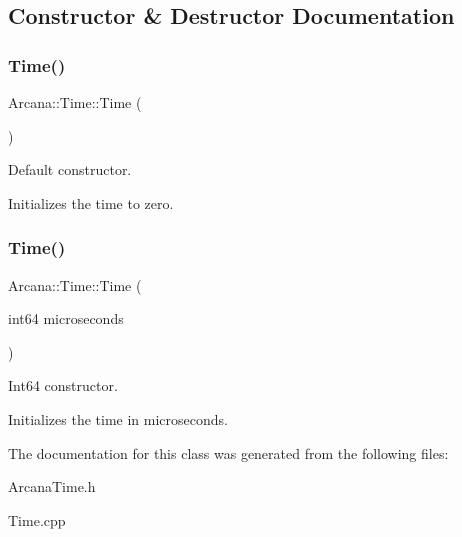 \subsection{Constructor \& Destructor Documentation}
\mbox{\label{class_arcana_1_1_time_a5a14897b858a9ab2ee905697981318c9}} 
\subsubsection{\texorpdfstring{Time()}{Time()}\hspace{0.1cm}{\footnotesize\ttfamily [1/2]}}
{\footnotesize\ttfamily Arcana\+::\+Time\+::\+Time (\begin{DoxyParamCaption}{ }\end{DoxyParamCaption})}



Default constructor. 

Initializes the time to zero. \mbox{\label{class_arcana_1_1_time_a12d30cc17ba7aabd9910fa33c4bf3271}} 
\subsubsection{\texorpdfstring{Time()}{Time()}\hspace{0.1cm}{\footnotesize\ttfamily [2/2]}}
{\footnotesize\ttfamily Arcana\+::\+Time\+::\+Time (\begin{DoxyParamCaption}\item[{int64}]{microseconds }\end{DoxyParamCaption})}



Int64 constructor. 

Initializes the time in microseconds. 

The documentation for this class was generated from the following files\+:\begin{DoxyCompactItemize}
\item 
Arcana\+Time.\+h\item 
Time.\+cpp\end{DoxyCompactItemize}
